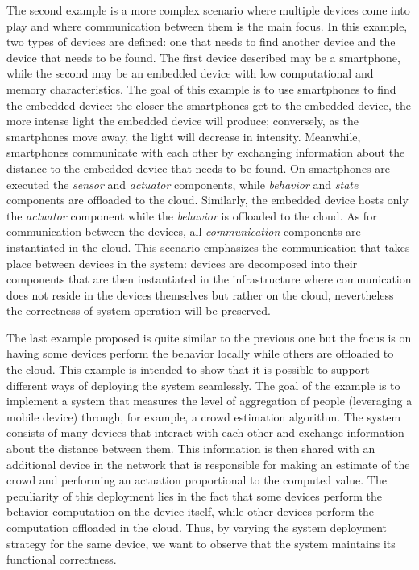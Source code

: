 The second example is a more complex scenario where multiple devices come into play and where communication between them is the main focus.
In this example, two types of devices are defined: one that needs to find another device and the device that needs to be found.
The first device described may be a smartphone, while the second may be an embedded device with low computational and memory characteristics.
The goal of this example is to use smartphones to find the embedded device: the closer the smartphones get to the embedded device, the more intense
light the embedded device will produce; conversely, as the smartphones move away, the light will decrease in intensity.
Meanwhile, smartphones communicate with each other by exchanging information about the distance to the embedded device that needs to be found.
On smartphones are executed the \emph{sensor} and \emph{actuator} components, while \emph{behavior} and \emph{state} components are offloaded to the
cloud. Similarly, the embedded device hosts only the \emph{actuator} component while the \emph{behavior} is offloaded to the cloud. As for 
communication between the devices, all \emph{communication} components are instantiated in the cloud.
This scenario emphasizes the communication that takes place between devices in the system: devices are decomposed into their components that are then
instantiated in the infrastructure where communication does not reside in the devices themselves but rather on the cloud, nevertheless the
correctness of system operation will be preserved.

The last example proposed is quite similar to the previous one but the focus is on having some devices perform the behavior locally while others 
are offloaded to the cloud. This example is intended to show that it is possible to support different ways of deploying the system seamlessly.
The goal of the example is to implement a system that measures the level of aggregation of people (leveraging a mobile device) through, for example,
a crowd estimation algorithm.
The system consists of many devices that interact with each other and exchange information about the distance between them. This information is then
shared with an additional device in the network that is responsible for making an estimate of the crowd and performing an actuation proportional
to the computed value. The peculiarity of this deployment lies in the fact that some devices perform the behavior computation on the device itself, 
while other devices perform the computation offloaded in the cloud. Thus, by varying the system deployment strategy for the same device, we want to 
observe that the system maintains its functional correctness.
